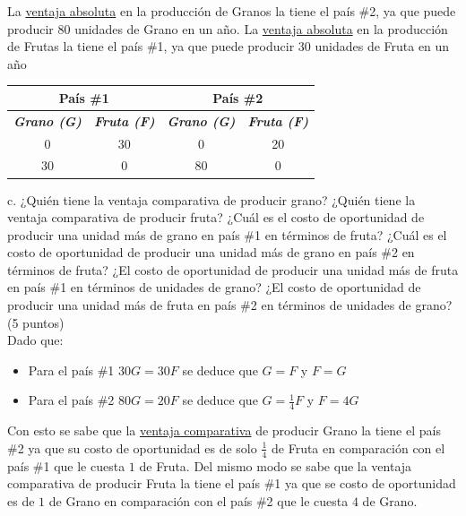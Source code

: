 \documentclass[12pt,dvipsnames]{article}
\begin{document}
La \underline{ventaja absoluta} en la producción de Granos la tiene el país \#2, ya que puede producir 80 unidades de Grano en un año. La \underline{ventaja absoluta} en la producción de Frutas la tiene el país \#1, ya que puede producir 30 unidades de Fruta en un año

\begin{table}[h]
	\centering
	\begin{tabular}{|cccc|}
		\hline
		\multicolumn{2}{|c|}{\textbf{País \#1}}                                        & \multicolumn{2}{c|}{\textbf{País \#2}}                    \\ \hline
		\textit{\textbf{Grano (G)}} & \multicolumn{1}{c|}{\textit{\textbf{Fruta (F)}}} & \textit{\textbf{Grano (G)}} & \textit{\textbf{Fruta (F)}} \\ \hline
		0                           & \multicolumn{1}{c|}{30}                          & 0                           & 20                          \\
		30                          & \multicolumn{1}{c|}{0}                           & 80                          & 0                           \\ \hline
	\end{tabular}
	
\end{table}


\newpage
c.	¿Quién tiene la ventaja comparativa de producir grano? ¿Quién tiene la ventaja comparativa de producir fruta? ¿Cuál es el costo de oportunidad de producir una unidad más de grano en país \#1 en términos de fruta? ¿Cuál es el costo de oportunidad de producir una unidad más de grano en país \#2 en términos de fruta? ¿El costo de oportunidad de producir una unidad más de fruta en país \#1 en términos de unidades de grano? ¿El costo de oportunidad de producir una unidad más de fruta en país \#2 en términos de unidades de grano? (5 puntos) \\

Dado que: 

\begin{itemize}
	\item Para el país \#1 $30G = 30F$ se deduce que $G = F$ y $F = G$
	\item Para el país \#2 $80G = 20F$ se deduce que $G = \frac{1}{4}F$ y $F = 4G$
\end{itemize}

Con esto se sabe que la \underline{ventaja comparativa} de producir Grano la tiene el país \#2 ya que su costo de oportunidad es de solo $\frac{1}{4}$ de Fruta en comparación con el país \#1 que le cuesta $1$ de Fruta.
Del mismo modo se sabe que la ventaja comparativa de producir Fruta la tiene el país \#1 ya que se costo de oportunidad es de $1$ de Grano en comparación con el país \#2 que le cuesta $4$ de Grano.\\
\end{document}
